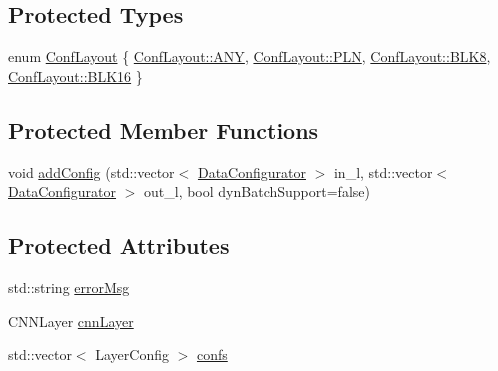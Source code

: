 \subsection*{Protected Types}
\begin{DoxyCompactItemize}
\item 
enum \hyperlink{classInferenceEngine_1_1Extensions_1_1Cpu_1_1ExtLayerBase_a1258a8d209e0249e0b1717618352ddfb}{Conf\+Layout} \{ \hyperlink{classInferenceEngine_1_1Extensions_1_1Cpu_1_1ExtLayerBase_a1258a8d209e0249e0b1717618352ddfba8e1bde3c3d303163521522cf1d62f21f}{Conf\+Layout\+::\+A\+NY}, 
\hyperlink{classInferenceEngine_1_1Extensions_1_1Cpu_1_1ExtLayerBase_a1258a8d209e0249e0b1717618352ddfba446687ea2db1ada75be5ed053be77f59}{Conf\+Layout\+::\+P\+LN}, 
\hyperlink{classInferenceEngine_1_1Extensions_1_1Cpu_1_1ExtLayerBase_a1258a8d209e0249e0b1717618352ddfba6023b7e0a175b8cf9cbcec3ac3cbf93d}{Conf\+Layout\+::\+B\+L\+K8}, 
\hyperlink{classInferenceEngine_1_1Extensions_1_1Cpu_1_1ExtLayerBase_a1258a8d209e0249e0b1717618352ddfba733623e98c6602d47f51e9f7be2f7d6c}{Conf\+Layout\+::\+B\+L\+K16}
 \}
\end{DoxyCompactItemize}
\subsection*{Protected Member Functions}
\begin{DoxyCompactItemize}
\item 
void \hyperlink{classInferenceEngine_1_1Extensions_1_1Cpu_1_1ExtLayerBase_a0ac7a6632e95b9500d5246b05b4b0bfa}{add\+Config} (std\+::vector$<$ \hyperlink{classInferenceEngine_1_1Extensions_1_1Cpu_1_1ExtLayerBase_1_1DataConfigurator}{Data\+Configurator} $>$ in\+\_\+l, std\+::vector$<$ \hyperlink{classInferenceEngine_1_1Extensions_1_1Cpu_1_1ExtLayerBase_1_1DataConfigurator}{Data\+Configurator} $>$ out\+\_\+l, bool dyn\+Batch\+Support=false)
\end{DoxyCompactItemize}
\subsection*{Protected Attributes}
\begin{DoxyCompactItemize}
\item 
std\+::string \hyperlink{classInferenceEngine_1_1Extensions_1_1Cpu_1_1ExtLayerBase_abc78e9b5a79fa339ffd831a5318f71f7}{error\+Msg}
\item 
C\+N\+N\+Layer \hyperlink{classInferenceEngine_1_1Extensions_1_1Cpu_1_1ExtLayerBase_a1074cdccacb9e9ca6eec01bbc2f7ca4a}{cnn\+Layer}
\item 
std\+::vector$<$ Layer\+Config $>$ \hyperlink{classInferenceEngine_1_1Extensions_1_1Cpu_1_1ExtLayerBase_a2a9f897007f2eb00e295cd25fd23fd5d}{confs}
\end{DoxyCompactItemize}


